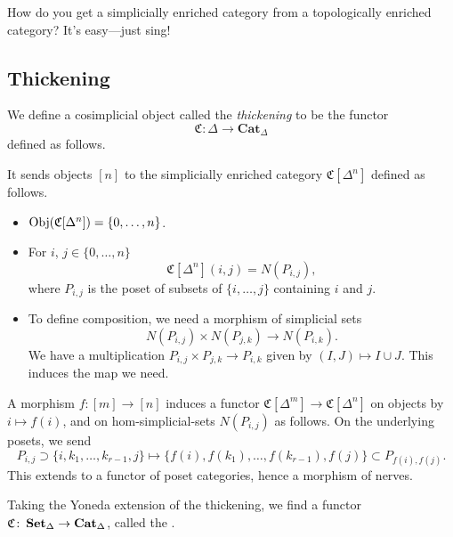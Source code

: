 \documentclass[main.tex]{subfiles}
\begin{document}
\begin{joke}
  How do you get a simplicially enriched category from a topologically enriched category? It's easy---just sing!
\end{joke}

\subsection{Thickening}
\label{ssc:thickening}

\begin{definition}[thickening]
  \label{def:thickening}
  We define a cosimplicial object called the \emph{thickening} to be the functor
  \begin{equation*}
    \mathfrak{C}\colon \Delta \to \mathbf{Cat}_{\Delta}
  \end{equation*}
  defined as follows.

  It sends objects $[n]$ to the simplicially enriched category $\mathfrak{C}[\Delta^{n}]$ defined as follows.
  \begin{itemize}
    \item $\operatorname{Obj}(\mathfrak{C}[\Delta^{n}]) = \{0, \ldots, n\}$.

    \item For $i$, $j \in \{0, \ldots, n\}$
      \begin{equation*}
        \mathfrak{C}[\Delta^{n}](i, j) = N(P_{i, j}),
      \end{equation*}
      where $P_{i, j}$ is the poset of subsets of $\{i, \ldots, j\}$ containing $i$ and $j$.

    \item To define composition, we need a morphism of simplicial sets
      \begin{equation*}
        N(P_{i,j}) \times N(P_{j,k}) \to N(P_{i, k}).
      \end{equation*}
      We have a multiplication $P_{i,j} \times P_{j, k} \to P_{i, k}$ given by $(I, J) \mapsto I \cup J$. This induces the map we need.
  \end{itemize}

  A morphism $f\colon [m] \to [n]$ induces a functor $\mathfrak{C}[\Delta^{m}] \to \mathfrak{C}[\Delta^{n}]$ on objects by $i \mapsto f(i)$, and on hom-simplicial-sets $N(P_{i,j})$ as follows. On the underlying posets, we send
  \begin{equation*}
    P_{i,j} \supset \{ i, k_{1}, \ldots, k_{r-1}, j \} \mapsto \{f(i), f(k_{1}), \ldots, f(k_{r-1}), f(j)\} \subset P_{f(i),f(j)}.
  \end{equation*}
  This extends to a functor of poset categories, hence a morphism of nerves.

  Taking the Yoneda extension of the thickening, we find a functor $\mathfrak{C}\colon \operatorname{\mathbf{Set}_{\Delta}} \to \operatorname{\mathbf{Cat}_{\Delta}}$, called the .
\end{definition}
\end{document}

